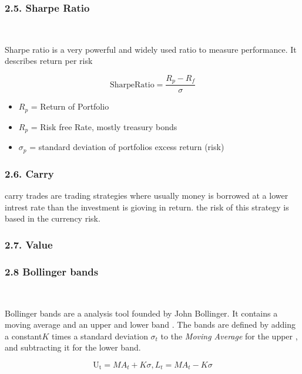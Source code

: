 \documentclass[
]{article}
\providecommand{\tightlist}{%
  \setlength{\itemsep}{0pt}\setlength{\parskip}{0pt}}
\begin{document}
\hypertarget{sharpe-ratio}{%
\subsubsection{2.5. Sharpe Ratio}\label{sharpe-ratio}}

~

Sharpe ratio is a very powerful and widely used ratio to measure
performance. It describes return per risk

\begin{equation}
  \label{eq:Sharperatio}
  \mathrm{SharpeRatio}=\frac{R_{p}-R_{f}}{\sigma}
\end{equation}

\begin{itemize}
\tightlist
\item
  \({R_p}\) = Return of Portfolio
\item
  \({R_p}\) = Risk free Rate, mostly treasury bonds
\item
  \({\sigma_p}\) = standard deviation of portfolios excess return (risk)
\end{itemize}

\hypertarget{carry}{%
\subsubsection{2.6. Carry}\label{carry}}

carry trades are trading strategies where usually money is borrowed at a
lower intrest rate than the investment is gioving in return. the risk of
this strategy is based in the currency risk.

\hypertarget{value}{%
\subsubsection{2.7. Value}\label{value}}

\hypertarget{bollinger-bands}{%
\subsubsection{2.8 Bollinger bands}\label{bollinger-bands}}

~

Bollinger bands are a analysis tool founded by John Bollinger. It
contains a moving average and an upper and lower band . The bands are
defined by adding a constant\({K}\) times a standard deviation
\({\sigma_t}\) to the \emph{Moving Average} for the upper , and
subtracting it for the lower band.

\begin{equation}
  \label{eq:lower and upper bollingerbands}
  \mathrm{U_t}=MA_{t}+K\sigma, L_{t}=MA_{t}-K\sigma
\end{equation}
\end{document}
